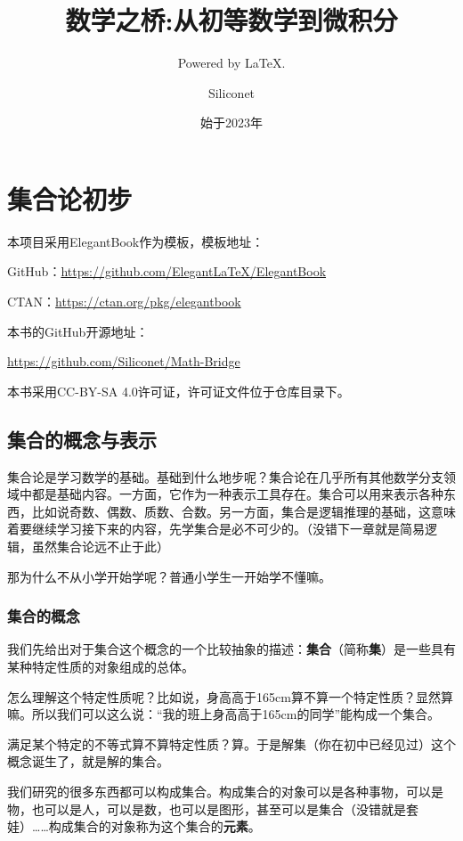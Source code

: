\documentclass[lang=cn,math=cm,chinesefont=nofont,11pt,scheme=chinese,twocol]{elegantbook}
\title{数学之桥:从初等数学到微积分}
\subtitle{Powered by \LaTeX.}
\author{Siliconet}
\date{始于2023年}
\begin{document}
\maketitle
\frontmatter

\tableofcontents

\mainmatter

\chapter{集合论初步}

本项目采用ElegantBook作为模板，模板地址：

GitHub：\href{https://github.com/ElegantLaTeX/ElegantBook}{https://github.com/ElegantLaTeX/ElegantBook}

CTAN：\href{https://ctan.org/pkg/elegantbook}{https://ctan.org/pkg/elegantbook}

本书的GitHub开源地址：

\href{https://github.com/Siliconet/Math-Bridge}{https://github.com/Siliconet/Math-Bridge}

本书采用CC-BY-SA 4.0许可证，许可证文件位于仓库目录下。

\section{集合的概念与表示}
集合论是学习数学的基础。基础到什么地步呢？集合论在几乎所有其他数学分支领域中都是基础内容。一方面，它作为一种表示工具存在。集合可以用来表示各种东西，比如说奇数、偶数、质数、合数。另一方面，集合是逻辑推理的基础，这意味着要继续学习接下来的内容，先学集合是必不可少的。（没错下一章就是简易逻辑，虽然集合论远不止于此）

那为什么不从小学开始学呢？普通小学生一开始学不懂嘛。

\subsection{集合的概念}

我们先给出对于集合这个概念的一个比较抽象的描述：\textbf{集合}（简称\textbf{集}）是一些具有某种特定性质的对象组成的总体。

怎么理解这个特定性质呢？比如说，身高高于165cm算不算一个特定性质？显然算嘛。所以我们可以这么说：“我的班上身高高于165cm的同学”能构成一个集合。

满足某个特定的不等式算不算特定性质？算。于是解集（你在初中已经见过）这个概念诞生了，就是解的集合。

我们研究的很多东西都可以构成集合。构成集合的对象可以是各种事物，可以是物，也可以是人，可以是数，也可以是图形，甚至可以是集合（没错就是套娃）……构成集合的对象称为这个集合的\textbf{元素}。
\end{document}
